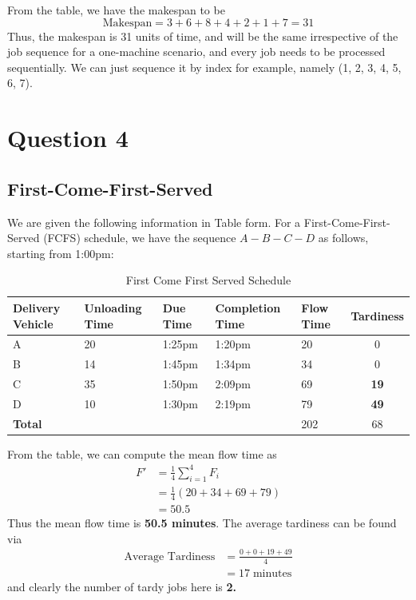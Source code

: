 \documentclass[12pt]{article}
\begin{document}
\noindent From the table, we have the makespan to be \begin{equation*}
    \text{Makespan} = 3 + 6 + 8 + 4 + 2 + 1 + 7 = 31
\end{equation*} Thus, the makespan is 31 units of time, and will be the same irrespective of the job sequence for a one-machine scenario, and every job needs to be processed sequentially. We can just sequence it by index for example, namely (1, 2, 3, 4, 5, 6, 7).

\newpage

\section*{Question 4}

\subsection*{First-Come-First-Served}

We are given the following information in Table form. For a First-Come-First-Served (FCFS) schedule, we have the sequence $A-B-C-D$ as follows, starting from 1:00pm: 

\begin{table}[H]
    \centering
    \begin{tabular}{p{1.8cm} p{3cm} p{1.8cm} p{3cm} p{1.8cm} c} \toprule
        \textbf{Delivery Vehicle} & \textbf{Unloading Time} & \textbf{Due Time} & \textbf{Completion Time} & \textbf{Flow Time} & \textbf{Tardiness} \\ \midrule 
        A & 20 & 1:25pm & 1:20pm & 20 & 0 \\ 
        B & 14 & 1:45pm & 1:34pm & 34 & 0 \\ 
        C & 35 & 1:50pm & 2:09pm & 69 & \textbf{19} \\ 
        D & 10 & 1:30pm & 2:19pm & 79 & \textbf{49} \\ \midrule
        \textbf{Total} & & & & 202 & 68 \\ \bottomrule
    \end{tabular}
    \caption{First Come First Served Schedule}
    \label{tab:4-fcfs}
\end{table}

\noindent From the table, we can compute the mean flow time as \begin{align*}
    F' &= \frac{1}{4} \sum_{i=1}^{4} F_i \\ 
    &= \frac{1}{4} \left( 20 + 34 + 69 + 79 \right) \\ 
    &= 50.5
\end{align*} Thus the mean flow time is \textbf{50.5 minutes}. The average tardiness can be found via \begin{align*}
    \text{Average Tardiness} &= \frac{0 + 0 + 19 + 49}{4} \\ 
    &= 17 \; \text{minutes}
\end{align*} and clearly the number of tardy jobs here is \textbf{2.} 
\end{document}
